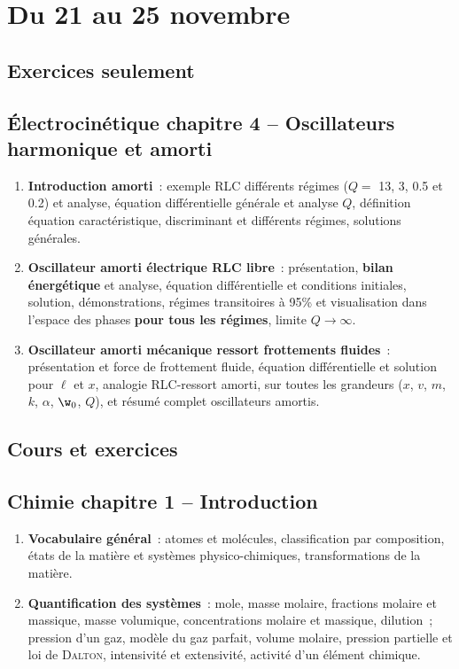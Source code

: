 \documentclass[a4paper, 12pt, final, garamond]{book}
\begin{document}
\setcounter{chapter}{8}

\chapter{Du 21 au 25 novembre}

\section{Exercices seulement}
\section*{Électrocinétique chapitre 4 -- Oscillateurs harmonique et amorti}

\begin{enumerate}[label=\Roman*, start=5]
    \item \textbf{Introduction amorti}~: exemple RLC différents régimes ($Q =$
        13, 3, 0.5 et 0.2) et analyse, équation différentielle générale et
        analyse $Q$, définition équation caractéristique, discriminant et
        différents régimes, solutions générales.
    \item \textbf{Oscillateur amorti électrique RLC libre}~: présentation,
        \textbf{bilan énergétique} et analyse, équation différentielle et
        conditions initiales, solution, démonstrations, régimes transitoires à
        95\% et visualisation dans l'espace des phases \textbf{pour tous les
        régimes}, limite $Q \rightarrow \infty$.
    \item \textbf{Oscillateur amorti mécanique ressort frottements fluides}~:
        présentation et force de frottement fluide, équation différentielle et
        solution pour $\ell$ et $x$, analogie RLC-ressort amorti, sur toutes les
        grandeurs ($x$, $v$, $m$, $k$, $\alpha$, $\w_0$, $Q$), et résumé complet
        oscillateurs amortis.
\end{enumerate}

\section{Cours et exercices}
\section*{Chimie chapitre 1 -- Introduction}
\begin{enumerate}[label=\Roman*]
    \item \textbf{Vocabulaire général}~: atomes et molécules, classification par
        composition, états de la matière et systèmes physico-chimiques,
        transformations de la matière.
    \item \textbf{Quantification des systèmes}~: mole, masse molaire, fractions
        molaire et massique, masse volumique, concentrations molaire et
        massique, dilution~; pression d'un gaz, modèle du gaz parfait, volume
        molaire, pression partielle et loi de \textsc{Dalton}, intensivité et
        extensivité, activité d'un élément chimique.
\end{enumerate}
\end{document}
